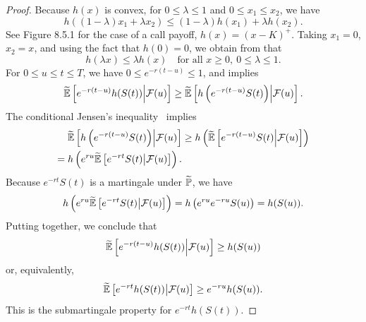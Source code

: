 \begin{proof}
	Because \(h(x)\) is convex, for \(0 \le \lambda \le 1\) and \(0 \le x_1 \le x_2\), we have
	\begin{equation}
		h((1-\lambda)x_1 + \lambda x_2) \le (1-\lambda)h(x_1) + \lambda h(x_2). \label{eq:ConvexityInequalityForH}
	\end{equation}
	See Figure 8.5.1 for the case of a call payoff, \(h(x) = (x-K)^+\).
	Taking \(x_1 = 0\), \(x_2 = x\), and using the fact that \(h(0) = 0\), we obtain from  that
	\begin{equation}
		h(\lambda x) \le \lambda h(x) \quad \text{for all } x \ge 0,\ 0 \le \lambda \le 1. \label{eq:ScalingInequalityForConvexH}
	\end{equation}
	For \(0 \le u \le t \le T\), we have \(0 \le e^{-r(t-u)} \le 1\), and  implies
	\begin{equation}
		\widetilde{\mathbb{E}}\left[e^{-r(t-u)}h(S(t)) \middle| \mathcal{F}(u)\right] \ge \widetilde{\mathbb{E}}\left[h\left(e^{-r(t-u)}S(t)\right) \middle| \mathcal{F}(u)\right]. \label{eq:ConditionalExpectationMonotonicity}
	\end{equation}
	The conditional Jensen's inequality~ implies
	\begin{equation}
		\begin{aligned}
			\widetilde{\mathbb{E}}\left[h\left(e^{-r(t-u)}S(t)\right) \middle| \mathcal{F}(u)\right] & \ge h\left(\widetilde{\mathbb{E}}\left[e^{-r(t-u)}S(t) \middle| \mathcal{F}(u)\right]\right) \\ = h\left(e^{ru}\widetilde{\mathbb{E}}\left[e^{-rt}S(t) \middle| \mathcal{F}(u)\right]\right).
		\end{aligned}
		\label{eq:ConditionalJensenInequality}
	\end{equation}
	Because \(e^{-rt}S(t)\) is a martingale under \(\widetilde{\mathbb{P}}\), we have
	\begin{equation}
		h\left(e^{ru}\widetilde{\mathbb{E}}\left[e^{-rt}S(t) \middle| \mathcal{F}(u)\right]\right) = h\left(e^{ru}e^{-ru}S(u)\right) = h(S(u)). \label{eq:MartingaleSubstitutionStep}
	\end{equation}
	Putting  together, we conclude that
	\begin{equation}
		\widetilde{\mathbb{E}}\left[e^{-r(t-u)}h(S(t)) \middle| \mathcal{F}(u)\right] \ge h(S(u)) \label{eq:PreDiscountedSubmartingaleInequality}
	\end{equation}
	or, equivalently,
	\begin{equation}
		\widetilde{\mathbb{E}}\left[e^{-rt}h(S(t)) \middle| \mathcal{F}(u)\right] \ge e^{-ru}h(S(u)). \label{eq:DiscountedIntrinsicSubmartingaleProperty}
	\end{equation}
	This is the submartingale property for \(e^{-rt}h(S(t))\).
\end{proof}

